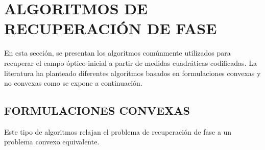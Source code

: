 


\chapter{ALGORITMOS DE RECUPERACIÓN DE FASE}
En esta sección, se presentan los algoritmos comúnmente utilizados para recuperar el campo óptico inicial a partir de medidas cuadráticas codificadas. La literatura ha planteado diferentes algoritmos basados en formulaciones convexas y no convexas como se expone a continuación.

\section{FORMULACIONES CONVEXAS}

Este tipo de algoritmos relajan el problema de recuperación de fase a un problema convexo equivalente.

